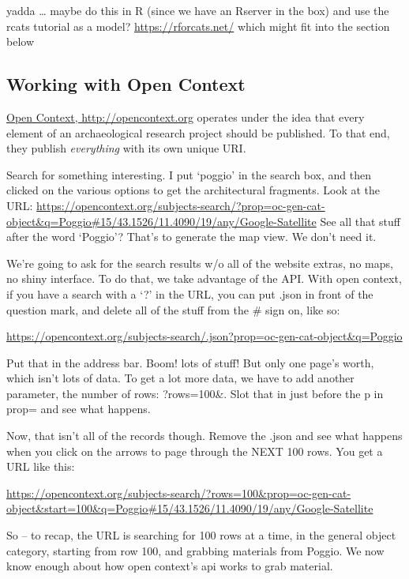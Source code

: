 \documentclass[english,]{book}
\begin{document}
yadda \ldots{} maybe do this in R (since we have an Rserver in the box)
and use the rcats tutorial as a model? \url{https://rforcats.net/} which
might fit into the section below

\subsection{Working with Open Context}\label{working-with-open-context}

\href{http://opencontext.org}{Open Context, http://opencontext.org}
operates under the idea that every element of an archaeological research
project should be published. To that end, they publish \emph{everything}
with its own unique URI.

Search for something interesting. I put `poggio' in the search box, and
then clicked on the various options to get the architectural fragments.
Look at the URL:
\url{https://opencontext.org/subjects-search/?prop=oc-gen-cat-object\&q=Poggio\#15/43.1526/11.4090/19/any/Google-Satellite}
See all that stuff after the word `Poggio'? That's to generate the map
view. We don't need it.

We're going to ask for the search results w/o all of the website extras,
no maps, no shiny interface. To do that, we take advantage of the API.
With open context, if you have a search with a `?' in the URL, you can
put .json in front of the question mark, and delete all of the stuff
from the \# sign on, like so:

\url{https://opencontext.org/subjects-search/.json?prop=oc-gen-cat-object\&q=Poggio}

Put that in the address bar. Boom! lots of stuff! But only one page's
worth, which isn't lots of data. To get a lot more data, we have to add
another parameter, the number of rows: ?rows=100\&. Slot that in just
before the p in prop= and see what happens.

Now, that isn't all of the records though. Remove the .json and see what
happens when you click on the arrows to page through the NEXT 100 rows.
You get a URL like this:

\url{https://opencontext.org/subjects-search/?rows=100\&prop=oc-gen-cat-object\&start=100\&q=Poggio\#15/43.1526/11.4090/19/any/Google-Satellite}

So -- to recap, the URL is searching for 100 rows at a time, in the
general object category, starting from row 100, and grabbing materials
from Poggio. We now know enough about how open context's api works to
grab material.
\end{document}

